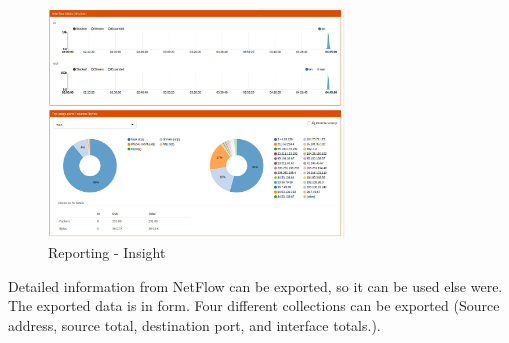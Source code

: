 \begin{figure}[h!]
    \centering
    \includegraphics[width=0.7\textwidth]{Images/reporting/insight_report.PNG}
    \caption{Reporting - Insight}
    \label{opnsense:reporting_insight}
\end{figure}


Detailed information from NetFlow can be exported, so it can be used else were. The exported data is in  form. Four different collections can be exported (Source address, source total, destination port, and interface totals.).

